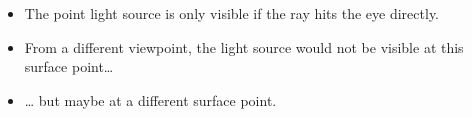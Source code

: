 \documentclass[utf8,stillsansserifmath,fleqn,t]{beamer}
\begin{document}
\begin{frame}[label=intro-mirroring]
\vspace*{-1ex}
\begin{itemize}
\item<2-> The point light source is only visible if the ray hits the eye directly.
\item<3-> From a different viewpoint, the light source would not be visible at
this surface point\ldots{}
\item<4-> \ldots{} but maybe at a different surface point.
\end{itemize}
\end{frame}
\end{document}
